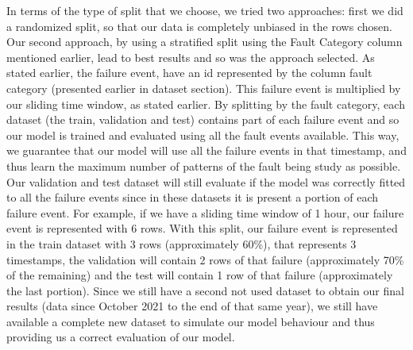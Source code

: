 In terms of the type of split that we choose, we tried two approaches: first we did a randomized split, so that our data is completely unbiased in the rows chosen. Our second approach, by using a stratified split using the Fault Category column mentioned earlier, lead to best results and so was the approach selected.
As stated earlier, the failure event, have an id represented by the column fault category (presented earlier in dataset section). This failure event is multiplied by our sliding time window, as stated earlier. By splitting by the fault category, each dataset (the train, validation and test) contains part of each failure event and so our model is trained and evaluated using all the fault events available. This way, we guarantee that our model will use all the failure events in that timestamp, and thus learn the maximum number of patterns of the fault being study as possible. Our validation and test dataset will still evaluate if the model was correctly fitted to all the failure events since in these datasets it is present a portion of each failure event.
For example, if we have a sliding time window of 1 hour, our failure event is represented with 6 rows. With this split, our failure event is represented in the train dataset with 3 rows (approximately 60\%), that represents 3 timestamps, the validation will contain 2 rows of that failure (approximately 70\% of the remaining) and the test will contain 1 row of that failure (approximately the last portion).
Since we still have a second not used dataset to obtain our final results (data since October 2021 to the end of that same year), we still have available a complete new dataset to simulate our model behaviour and thus providing us a correct evaluation of our model.


